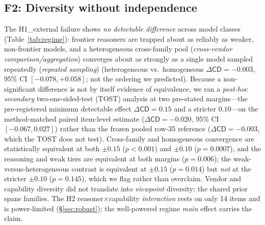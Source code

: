 \documentclass[acmsmall,screen,nonacm]{acmart}
\newcommand{\cd}{\textsf{CD}}
\begin{document}
\subsection{F2: Diversity without independence}
\label{sec:f2}
The H1\_external failure shows \emph{no detectable difference} across model classes (Table~\ref{tab:regime}): frontier
reasoners are trapped about as reliably as weaker, non-frontier models, and a heterogeneous cross-family pool
(\emph{cross-vendor comparison/aggregation}) converges about as strongly as a single model sampled repeatedly
(\emph{repeated sampling}) (heterogeneous vs.\ homogeneous $\Delta\cd=-0.003$, 95\% CI
$[-0.078,+0.058]$; not the ordering we predicted). Because a non-significant difference is not by itself
evidence of equivalence, we ran a \emph{post-hoc secondary} two-one-sided-test (TOST) analysis at two
pre-stated margins---the pre-registered minimum detectable effect $\Delta\cd=0.15$ and a stricter
$0.10$---on the method-matched paired item-level estimate ($\Delta\cd=-0.020$, 95\% CI $[-0.067,0.027]$)
rather than the frozen
pooled row-35 reference ($\Delta\cd=-0.003$, which the TOST does not test). Cross-family and homogeneous convergence are
statistically equivalent at both $\pm0.15$ ($p<0.001$) and $\pm0.10$ ($p=0.0007$), and the reasoning and
weak tiers are equivalent at both margins ($p=0.006$); the weak-versus-heterogeneous contrast is equivalent
at $\pm0.15$ ($p=0.014$) but \emph{not} at the stricter $\pm0.10$ ($p=0.145$), which we flag rather than
overclaim. Vendor and capability diversity did not translate into
\emph{viewpoint} diversity: the shared prior spans families. The H2 reasoner$\times$capability
\emph{interaction} rests on only 14 items and is power-limited (\S\ref{sec:robust}); the well-powered regime
\emph{main} effect carries the claim.
\end{document}
